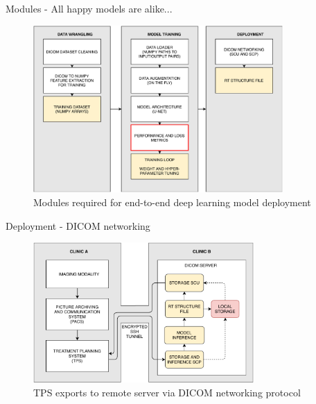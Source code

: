 \documentclass[9pt]{beamer}
\begin{document}
\begin{frame}{Modules - All happy models are alike...}
  \begin{figure}
    \includegraphics[width=0.85\textwidth]{images/modules_loss}
    \caption{Modules required for end-to-end deep learning model deployment}
  \end{figure}
\end{frame}


\begin{frame}{Deployment - DICOM networking}
\begin{figure}
\includegraphics[width=0.75\textwidth]{images/dicom_networking}
\caption{TPS exports to remote server via DICOM networking protocol}
\end{figure}
\end{frame}
%

\end{document}
